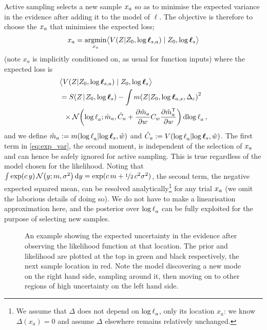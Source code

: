 \documentclass{article}
\begin{document}
Active sampling selects a new sample $\lfv_a$ so as to minimise the expected variance in the evidence after adding it to the model of $\ell$.  The objective is therefore to choose the $\lfv_a$ that minimises the expected loss;
%
\begin{align}
\lfv_a = \argmin_{\lfv_a} \bigl\langle \cov{\If}{Z_0,\tvr_{s,a}}\mid Z_0,\tvr_{s}\bigr\rangle 
\end{align}
(note $x_a$ is implicitly conditioned on, as usual for function inputs) where the expected loss is
\begin{align}
&\bigl\langle \cov{\If}{Z_0,\tvr_{s,a}}\mid Z_0,\tvr_{s}\bigr\rangle 
\nonumber\\
 & = \secm{\If}{Z_0,\tvr_s} 
 - \int\mean{\If}{Z_0,\tvr_{a,s},\Delta_c}^2\nonumber\\
& \hspace{0.2cm}
\times\N{\tr_a}
{\hat{m}_a }
{\hat{C}_a +\pderiv{\hat{m}_a}{w}C_w\pderiv{\hat{m}\tra_a}{w}}
\ud\tr_a\,,\label{eq:exp_var}
\end{align}
and we define
$\hat{m}_a \deq \mean{\tr_a}{\tvr_s,\hat{w}}$
and
$\hat{C}_a \deq \cov{\tr_a}{\tvr_s,\hat{w}}$.
The first term in \eqref{eq:exp_var}, the second moment, is independent of the selection of $\lfv_a$ and can hence  be safely ignored for active sampling. This is true regardless of the model chosen for the likelihood. 
Noting that $\int \exp(c\, y)\, \N{y}{m}{\sigma^2} \ud y = \exp(c\, m + \nicefrac{1}{2}\, c^2 \sigma^2)$, 
the second term, the negative expected squared mean, can be resolved analytically\footnote{We assume that $\Delta$ does not depend on $\tr_a$, only its location $x_a$: we know $\Delta(x_a) = 0$ and assume $\Delta$ elsewhere remains relatively unchanged.}
 for any trial $\lfv_a$ (we omit the laborious details of doing so). We do not have to make a linearisation approximation here, and the posterior over $\tr_a$ can be fully exploited for the purpose of selecting new samples.
%
 \begin{figure}
 \centering
{}
 \caption{An example showing the expected uncertainty in the evidence after observing the likelihood function at that location. The prior and likelihood are plotted at the top in green and black respectively, the next sample location in red.  Note the model discovering a new mode on the right hand side, sampling around it, then moving on to other regions of high uncertainty on the left hand side. }
 \label{fig:eue}
 \end{figure}
%
\end{document}
